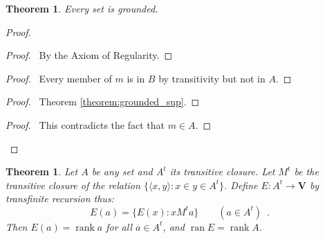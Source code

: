 \documentclass{article}
\let\qed\relax
\newtheorem{theorem}[axiom]{Theorem}
\theoremstyle{definition}
\newcommand{\ran}{\ensuremath{\operatorname{ran}}}
\newcommand{\rank}{\ensuremath{\operatorname{rank}}}
\begin{document}
    \begin{theorem}
        Every set is grounded.
    \end{theorem}
    
    \begin{proof}
        \pf
            \begin{proof}
                \pf\ By the Axiom of Regularity.
            \end{proof}
            \begin{proof}
                \pf\ Every member of $m$ is in $B$ by transitivity but not in $A$.
            \end{proof}
            \begin{proof}
                \pf\ Theorem \ref{theorem:grounded_sup}.
            \end{proof}
            \qedstep
            \begin{proof}
                \pf\ This contradicts the fact that $m \in A$.
            \end{proof}
        \qed
    \end{proof}

    \begin{theorem}
        Let $A$ be any set and $A^t$ its transitive closure. Let $M^t$
        be the transitive closure of the relation $\{ \langle x,y \rangle : x \in y \in A^t \}$.
        Define $E : A^t \rightarrow \mathbf{V}$
        by transfinite recursion thus:
        \[ E(a) = \{ E(x) : x M^t a \} \qquad (a \in A^t) \enspace . \]
        Then $E(a) = \rank a$ for all $a \in A^t$, and $\ran E = \rank A$.
    \end{theorem}
\end{document}
